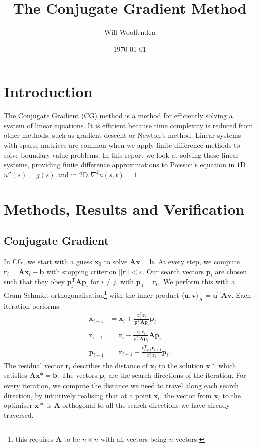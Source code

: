 \documentclass{article}
\title{The Conjugate Gradient Method}
\author{Will Woolfenden}
\date{\today}
\begin{document}
\maketitle

\section{Introduction}

The Conjugate Gradient (CG) method is a method for efficiently solving a system of linear equations.
It is efficient because time complexity is reduced from other methods, such as gradient descent or Newton's method.
Linear systems with sparse matrices are common when we apply finite difference methods to solve boundary value problems. 
In this report we look at solving these linear systems,
providing finite difference approximations to Poisson's equation in $1$D $u''(s) = g(s)$
and in $2$D $\nabla^2 u(s,t) = 1$.

\section{Methods, Results and Verification}
\subsection{Conjugate Gradient}
In CG, we start with a guess $\mathbf{x}_0$ to solve $\mathbf{Ax}=\mathbf{b}$.
At every step, we compute $\mathbf{r}_i=\mathbf{Ax}_i-\mathbf{b}$ with stopping criterion $||\mathbf{r}||<\varepsilon$.
Our search vectors $\mathbf{p}_i$ are chosen such that they obey $\mathbf{p}_j^\mathrm{T}\mathbf{Ap}_i$ for $i\ne j$, with $\mathbf{p}_0 = \mathbf{r}_0$.
We perform this with a Gram-Schmidt orthogonalisation\footnote{
	this requires $\mathbf{A}$ to be $n \times n$ with all vectors being $n$-vectors.  
} with the inner product $\langle \mathbf{u},\mathbf{v}\rangle_\mathbf{A} = \mathbf{u}^\mathrm{T}\mathbf{Av}$.
Each iteration performs
\begin{align*}
	\mathbf{x}_{i+1} &= \mathbf{x}_i + \frac{\mathbf{r}_i^\mathrm{T}\mathbf{r}_i}{\mathbf{p}^\mathrm{T}_i\mathbf{Ap}_i}\mathbf{p}_i\\
	\mathbf{r}_{i+1} &= \mathbf{r}_i - \frac{\mathbf{r}_i^\mathrm{T}\mathbf{r}_i}{\mathbf{p}^\mathrm{T}_i\mathbf{Ap}_i}\mathbf{Ap}_i\\
	\mathbf{p}_{i+1} &= \mathbf{r}_{i+1}+\frac{\mathbf{r}_{i+1}^\mathrm{T}\mathbf{r}_{i+1}}{\mathbf{r}_{i}^\mathrm{T}\mathbf{r}_{i}}\mathbf{p}_i.
\end{align*}
The residual vector $\mathbf{r}_i$ describes the distance of $\mathbf{x}_i$ to the solution $\mathbf{x}*$ which satisfies $\mathbf{Ax}* = \mathbf{b}$.
The vectors $\mathbf{p}_i$ are the search directions of the iteration.
For every iteration, we compute the distance we need to travel along each search direction,
by intuitively realising that at a point $\mathbf{x}_i$, 
the vector from $\mathbf{x}_i$ to the optimiser $\mathbf{x}*$ is $\mathbf{A}$-orthogonal to all the search directions we have already traversed. 
\end{document}
